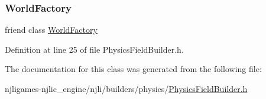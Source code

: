 \subsubsection{\texorpdfstring{World\+Factory}{WorldFactory}}
{\footnotesize\ttfamily friend class \mbox{\hyperlink{classnjli_1_1_world_factory}{World\+Factory}}\hspace{0.3cm}{\ttfamily [friend]}}



Definition at line 25 of file Physics\+Field\+Builder.\+h.



The documentation for this class was generated from the following file\+:\begin{DoxyCompactItemize}
\item 
njligames-\/njlic\+\_\+engine/njli/builders/physics/\mbox{\hyperlink{_physics_field_builder_8h}{Physics\+Field\+Builder.\+h}}\end{DoxyCompactItemize}
